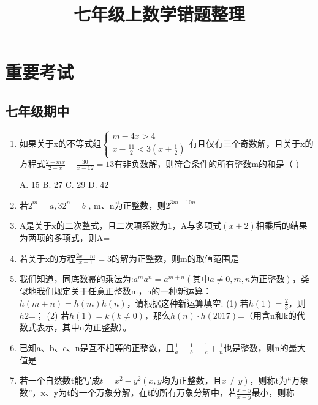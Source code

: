 \documentclass[UTF8]{ctexart}
\title{七年级上数学错题整理}
\begin{document}
\maketitle
\tableofcontents

\section{重要考试}

\subsection{七年级期中} 

\begin{enumerate}
\item 如果关于x的不等式组$\begin{cases} m-4x>4 \\ x-\frac{11}{2}<3(x+\frac{1}{2}) \end{cases} $有且仅有三个奇数解，且关于x的方程式$\frac{2-mx}{2-x}-\frac{30}{x-12}=13$有非负数解，则符合条件的所有整数m的和是（     )

   A. 15
   B. 27
   C. 29
   D. 42

\item 若$ 2^m=a,32^n=b $ , m、n为正整数，则$2^{3m-10n}$=\underline{\quad\quad}

\item A是关于x的二次整式，且二次项系数为1，A与多项式$(x+2)$相乘后的结果为两项的多项式，则A=\underline{\quad}

\item 若关于x的方程$\frac{2x+m}{x-1}=3$的解为正整数，则m的取值范围是\underline{\quad\quad\quad}

\item 我们知道，同底数幂的乘法为:$a^ma^n=a^{m+n}(其中a \neq 0, m,n为正整数)$，类似地我们规定关于任意正整数m，n的一种新运算：$h(m+n)=h(m)h(n)$，请根据这种新运算填空:
   (1) 若$h(1)=\frac{2}{3}$，则$h{2}$=\underline{\quad\quad\quad}；
   (2) 若$h(1)=k(k \neq 0)$，那么$h(n) \cdot h(2017)$=\underline{\quad\quad\quad}（用含n和k的代数式表示，其中n为正整数）。

\item 已知a、b、c、n是互不相等的正整数，且$\frac{1}{a}+\frac{1}{b}+\frac{1}{c}+\frac{1}{n}$也是整数，则n的最大值是\underline{\quad\quad\quad\quad}

\item 若一个自然数t能写成$t=x^2-y^2(x,y均为正整数，且x \neq y)$，则称t为“万象数”，x、y为t的一个万象分解，在t的所有万象分解中，若$\frac{x-y}{x+y}$最小，则称

\end{enumerate}
\end{document}
